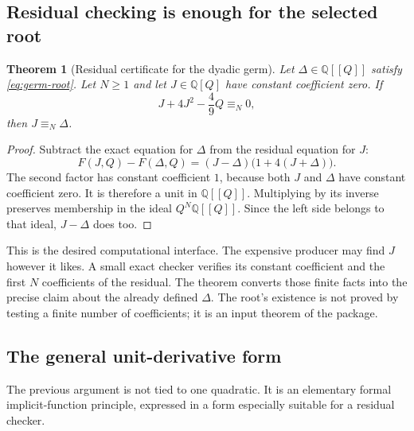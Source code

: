 \documentclass[11pt,letterpaper]{article}
\newcommand{\Q}{\mathbb Q}
\newtheorem{theorem}{Theorem}[section]
\theoremstyle{definition}
\theoremstyle{remark}
\begin{document}
\subsection{Residual checking is enough for the selected root}
\begin{theorem}[Residual certificate for the dyadic germ]
Let $\Delta\in\Q[[Q]]$ satisfy \eqref{eq:germ-root}. Let $N\geq1$ and let
$J\in\Q[Q]$ have constant coefficient zero. If
\[
 J+4J^2-\frac49Q\equiv_N0,
\]
then $J\equiv_N\Delta$.
\end{theorem}
\begin{proof}
Subtract the exact equation for $\Delta$ from the residual equation for $J$:
\[
 F(J,Q)-F(\Delta,Q)
 =(J-\Delta)\bigl(1+4(J+\Delta)\bigr).
\]
The second factor has constant coefficient $1$, because both $J$ and $\Delta$
have constant coefficient zero. It is therefore a unit in $\Q[[Q]]$. Multiplying
by its inverse preserves membership in the ideal $Q^N\Q[[Q]]$. Since the left
side belongs to that ideal, $J-\Delta$ does too.
\end{proof}
This is the desired computational interface. The expensive producer may find
$J$ however it likes. A small exact checker verifies its constant coefficient
and the first $N$ coefficients of the residual. The theorem converts those
finite facts into the precise claim about the already defined $\Delta$.
The root's existence is not proved by testing a finite number of coefficients;
it is an input theorem of the package.

\subsection{The general unit-derivative form}
The previous argument is not tied to one quadratic. It is an elementary
formal implicit-function principle, expressed in a form especially suitable
for a residual checker.
\end{document}
